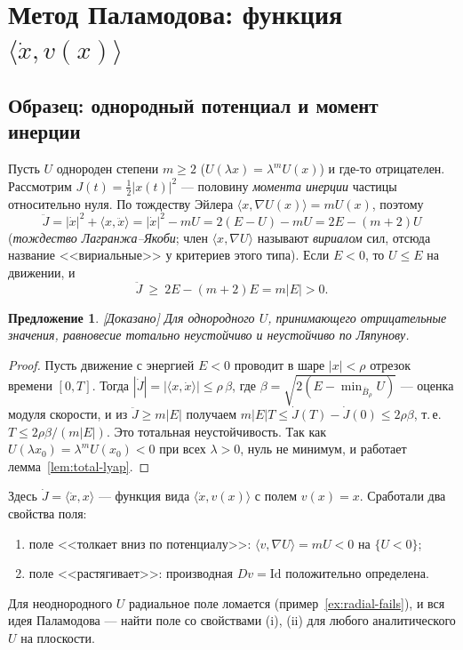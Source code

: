 \documentclass[11pt,a4paper]{article}
\newtheorem{proposition}[theorem]{Предложение}
\theoremstyle{definition}
\newcommand{\Id}{\mathrm{Id}}
\newcommand{\mk}[1]{\textsf{[#1]}}
\newcommand{\term}[1]{\emph{#1}}
\begin{document}
\section{Метод Паламодова: функция $\langle\dot x,v(x)\rangle$}\label{sec:method}

\subsection{Образец: однородный потенциал и момент инерции}

Пусть $U$ однороден степени $m\ge2$ ($U(\lambda x)=\lambda^mU(x)$) и где-то отрицателен.
Рассмотрим $J(t)=\tfrac12|x(t)|^2$ --- половину \term{момента инерции} частицы относительно нуля.
По тождеству Эйлера $\langle x,\nabla U(x)\rangle=mU(x)$, поэтому
\[
\ddot J=|\dot x|^2+\langle x,\ddot x\rangle=|\dot x|^2-mU=2(E-U)-mU=2E-(m+2)U
\]
(\term{тождество Лагранжа--Якоби}; член $\langle x,\nabla U\rangle$ называют \term{вириалом} сил,
отсюда название <<вириальные>> у критериев этого типа). Если $E<0$, то $U\le E$ на движении, и
\[
\ddot J\ \ge\ 2E-(m+2)E=m|E|>0.
\]

\begin{proposition}\label{prop:homog}
\mk{Доказано} Для однородного $U$, принимающего отрицательные значения, равновесие тотально
неустойчиво и неустойчиво по Ляпунову.
\end{proposition}
\begin{proof}
Пусть движение с энергией $E<0$ проводит в шаре $|x|<\rho$ отрезок времени $[0,T]$. Тогда
$|\dot J|=|\langle x,\dot x\rangle|\le\rho\,\beta$, где $\beta=\sqrt{2(E-\min_{\bar B_\rho}U)}$ ---
оценка модуля скорости, и из $\ddot J\ge m|E|$ получаем $m|E|T\le\dot J(T)-\dot J(0)\le2\rho\beta$,
т.\,е. $T\le2\rho\beta/(m|E|)$. Это тотальная неустойчивость. Так как
$U(\lambda x_0)=\lambda^mU(x_0)<0$ при всех $\lambda>0$, нуль не минимум, и работает
лемма~\ref{lem:total-lyap}.
\end{proof}

Здесь $\dot J=\langle\dot x,x\rangle$ --- функция вида $\langle\dot x,v(x)\rangle$ с полем $v(x)=x$.
Сработали два свойства поля:
\begin{enumerate}[label=(\roman*)]
\item поле <<толкает вниз по потенциалу>>: $\langle v,\nabla U\rangle=mU<0$ на $\{U<0\}$;
\item поле <<растягивает>>: производная $Dv=\Id$ положительно определена.
\end{enumerate}
Для неоднородного $U$ радиальное поле ломается (пример~\ref{ex:radial-fails}), и вся идея
Паламодова --- найти поле со свойствами (i), (ii) для любого аналитического $U$ на плоскости.
\end{document}
